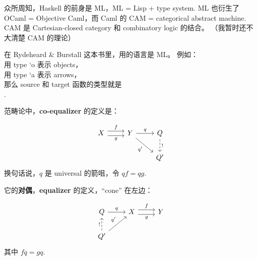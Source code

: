 \documentclass[12pt, orivec]{article}
\newcommand{\cc}[2]{#1}
\newcommand{\cc}[2]{#2}
\newcommand{\code}   [1]{{\footnotesize{\ttfamily #1}}}
\newcommand{\tab}{\hspace*{2cm}}
\begin{document}
\begin{tcolorbox}
\cc{众所周知，Haskell 的前身是 ML，ML = Lisp + type system.  ML 也衍生了 OCaml = Objective Caml，而 Caml 的 CAM = categorical abstract machine.  CAM 是 Cartesian-closed category 和 combinatory logic 的结合。 （我暂时还不大清楚 CAM 的理论）
}{
As we all know, Haskell's predecessor is ML, ML = Lisp + type system. ML also derives OCaml = Objective Caml, and Caml's CAM = categorical abstract machine. CAM is a combination of Cartesian-closed category and combinatory logic. (I don't know the theory of CAM for the time being)
}
\end{tcolorbox}

\cc{在 Rydeheard \& Burstall 这本书里，用的语言是 ML。 例如： \\
}{
In the book Rydeheard \& Burstall, the language used is ML. E.g: \\
}
\tab 用 type \code{`o} 表示 objects，\\
\tab 用 type \code{`a} 表示 arrows，\\
\cc{那么 source 和 target 函数的类型就是 \\
}{
Then the type of the source and target functions is \\
}
\tab \code{`a -> `o}.

\cc{范畴论中，\textbf{co-equalizer} 的定义是：
}{
In category theory, the definition of \textbf{co-equalizer} is:
}
\begin{equation}
\begin{tikzcd}
X \ar[r,shift left=.75ex,"f"]
  \ar[r,shift right=.75ex,swap,"g"]
&
Y \ar[r,"q"] \ar[dr,swap,"q'"]
&
Q \ar[d,densely dashed, "!"]
\\
& & Q'
\end{tikzcd}
\end{equation}
\cc{换句话说，$q$ 是 universal 的箭咀，令 $qf = qg$.
}{
In other words, $q$ is a universal arrow, making $qf = qg$.
}

\cc{它的\textbf{对偶}，\textbf{equalizer} 的定义，``cone'' 在左边：
}{
Its \textbf{dual}, the definition of \textbf{equalizer}, ``cone'' is on the left:
}
\begin{equation}
\begin{tikzcd}
Q \ar[r,"q"]
&
X \ar[r,shift left=.75ex,"f"]
  \ar[r,shift right=.75ex,swap,"g"]
&
Y
\\
Q' \ar[ur,"q'"]
   \ar[u,densely dashed, "!"]
 & &
\end{tikzcd}
\end{equation}
\cc{其中 $fq = gq$.
}{
Where $fq = gq$.
}
\end{document}
